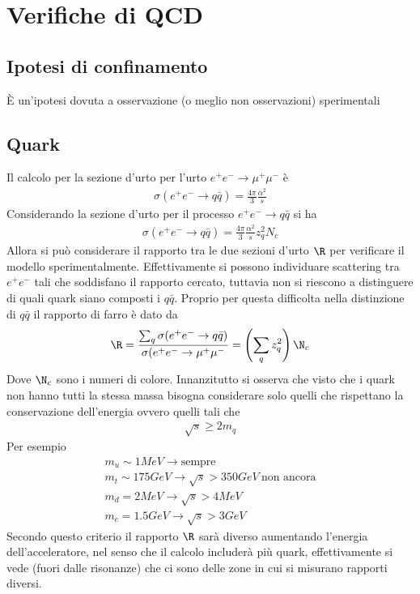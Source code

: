 \documentclass[12pt]{book}
\begin{document}
\newpage
\section{Verifiche di QCD}
\subsection{Ipotesi di confinamento}
È un'ipotesi dovuta a osservazione (o meglio non osservazioni) sperimentali

\subsection{Quark}
Il calcolo per la sezione d'urto per l'urto $e^+e^- \rightarrow \mu^+ \mu^-$ è
\begin{gather}
		\sigma (e^+ e^- \rightarrow q \bar q) = \frac{4 \pi}{3} \frac{\alpha^2}{s} 
\end{gather}
Considerando la sezione d'urto per il processo $e^+e^- \rightarrow q \bar q$ si ha
\begin{gather}
	\sigma (e^+ e^- \rightarrow q \bar q) = \frac{4 \pi}{3} \frac{\alpha^2}{s} z^2_q N_c 
\end{gather}
Allora si può considerare il rapporto tra le due sezioni d'urto $\R$ per verificare il modello sperimentalmente. Effettivamente si possono individuare scattering tra $e^+ e^-$ tali che soddisfano il rapporto cercato, tuttavia non si riescono a distinguere di quali quark siano composti i $q \bar q$. Proprio per questa difficolta nella distinzione di $q \bar q$ il rapporto di farro è dato da 
\begin{gather}
	\R = \frac{\sum_q \sigma (e^+ e^- \rightarrow q \bar q)}{\sigma (e^+e^- \rightarrow \mu^+ \mu^-} = \left(\sum_q z_q^2 \right)\N_c
\end{gather}
Dove $\N_c$ sono i numeri di colore. Innanzitutto si osserva che visto che i quark non hanno tutti la stessa massa bisogna considerare solo quelli che rispettano la conservazione dell'energia ovvero quelli tali che
\begin{gather}
	\sqrt{s} \ge 2 m_q
\end{gather}
Per esempio 
\begin{gather}
	m_u \sim 1 MeV \rightarrow \text{sempre}\\
	m_t \sim 175 GeV \rightarrow \sqrt{s} > 350 GeV \ \text{non ancora}\\
	m_d = 2MeV \rightarrow \sqrt{s} > 4 MeV\\
	m_c = 1.5 GeV \rightarrow \sqrt{s} > 3 GeV
\end{gather}
Secondo questo criterio il rapporto $\R$ sarà diverso aumentando l'energia dell'acceleratore, nel senso che il calcolo includerà più quark, effettivamente si vede (fuori dalle risonanze) che ci sono delle zone in cui si misurano rapporti diversi.
\end{document}
